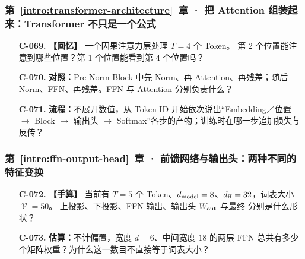 \subsubsection*{第~\ref*{intro:transformer-architecture}~章 · 把 Attention 组装起来：Transformer 不只是一个公式}
\begin{enumerate}[label={},leftmargin=4.8em,itemsep=4pt]
\item[\textbf{C-069.}] \leavevmode{}\label{exercise:C-069}\label{exercise:causal-position-visibility}\textbf{【回忆】} 一个因果注意力层处理 $T=4$ 个 Token。
第 2 个位置能注意到哪些位置？第 1 个位置能看到第 4 个位置吗？
\item[\textbf{C-070.}] \leavevmode{}\label{exercise:C-070}\label{exercise:block-branch-roles}\textbf{对照：}Pre-Norm Block 中先 Norm、再 Attention、再残差；随后 Norm、FFN、再残差。FFN 与 Attention 分别负责什么？
\item[\textbf{C-071.}] \leavevmode{}\label{exercise:C-071}\label{exercise:token-to-loss-pipeline}\textbf{流程：}不展开数值，从 Token ID 开始依次说出“Embedding／位置 $\to$ Block $\to$ 输出头 $\to$ Softmax”各步的产物；训练时在哪一步追加损失与反传？
\end{enumerate}
\subsubsection*{第~\ref*{intro:ffn-output-head}~章 · 前馈网络与输出头：两种不同的特征变换}
\begin{enumerate}[label={},leftmargin=4.8em,itemsep=4pt]
\item[\textbf{C-072.}] \leavevmode{}\label{exercise:C-072}\label{exercise:ffn-output-shapes}\textbf{【手算】} 当前有 $T=5$ 个 Token、$d_{\rm model}=8$、$d_{\rm ff}=32$，词表大小 $|\mathcal V|=50$。 上投影、下投影、FFN 输出、输出头 $W_{\rm out}$ 与最终  分别是什么形状？
\item[\textbf{C-073.}] \leavevmode{}\label{exercise:C-073}\label{exercise:ffn-weight-count}\textbf{估算：}不计偏置，宽度 $d=6$、中间宽度 $18$ 的两层 FFN 总共有多少个矩阵权重？为什么这一数目不直接等于词表大小？
\end{enumerate}
